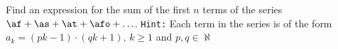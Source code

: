 
%
%
%
%
% 
% 



\gcalcexpr[0]\tp{\vbone * \vbone}
\gcalcexpr[0]
\gcalcexpr[0]
\gcalcexpr[0]

\gcalcexpr[0]
\gcalcexpr[0]
\gcalcexpr[0]
\gcalcexpr[0]

\question[3] Find an expression for the sum of the first $n$ terms of the series 
$\af + \as + \at + \afo + \ldots$. \texttt{Hint:} Each term in the series is of the 
form $a_k = (pk-1)\cdot(qk+1),\, k \geq 1$ and $p,q \in\aleph$

